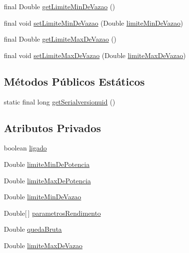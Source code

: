 \begin{DoxyCompactItemize}
\item 
final Double \hyperlink{classusina_1_1_d_a_o_1_1turbina_1_1_turbina_transfer_a4b6e40f8a29ecc5a568950cf150644ee}{get\-Limite\-Min\-De\-Vazao} ()
\item 
final void \hyperlink{classusina_1_1_d_a_o_1_1turbina_1_1_turbina_transfer_aab387846f77bd4763b074148dc03d19c}{set\-Limite\-Min\-De\-Vazao} (Double \hyperlink{classusina_1_1_d_a_o_1_1turbina_1_1_turbina_transfer_aa90e1fc61b14789cf04163ae4b76b810}{limite\-Min\-De\-Vazao})
\item 
final Double \hyperlink{classusina_1_1_d_a_o_1_1turbina_1_1_turbina_transfer_a8fe718b17c9f695aa6a48b7d7a153fb8}{get\-Limite\-Max\-De\-Vazao} ()
\item 
final void \hyperlink{classusina_1_1_d_a_o_1_1turbina_1_1_turbina_transfer_a8f62414f1ea058927f7dd90497ea275e}{set\-Limite\-Max\-De\-Vazao} (Double \hyperlink{classusina_1_1_d_a_o_1_1turbina_1_1_turbina_transfer_a07a09b7c71eb2f197aaf343851fe8f7b}{limite\-Max\-De\-Vazao})
\end{DoxyCompactItemize}
\subsection*{Métodos Públicos Estáticos}
\begin{DoxyCompactItemize}
\item 
static final long \hyperlink{classusina_1_1_d_a_o_1_1turbina_1_1_turbina_transfer_a69998933bc99e29515935abd270cba92}{get\-Serialversionuid} ()
\end{DoxyCompactItemize}
\subsection*{Atributos Privados}
\begin{DoxyCompactItemize}
\item 
boolean \hyperlink{classusina_1_1_d_a_o_1_1turbina_1_1_turbina_transfer_ae108175db307ad716b1508b2be10dba3}{ligado}
\item 
Double \hyperlink{classusina_1_1_d_a_o_1_1turbina_1_1_turbina_transfer_a9b91ed0c68d559ef9c7e2ea953bf052a}{limite\-Min\-De\-Potencia}
\item 
Double \hyperlink{classusina_1_1_d_a_o_1_1turbina_1_1_turbina_transfer_aaec5e55fb790620bbf92f759a3165a97}{limite\-Max\-De\-Potencia}
\item 
Double \hyperlink{classusina_1_1_d_a_o_1_1turbina_1_1_turbina_transfer_aa90e1fc61b14789cf04163ae4b76b810}{limite\-Min\-De\-Vazao}
\item 
Double\mbox{[}$\,$\mbox{]} \hyperlink{classusina_1_1_d_a_o_1_1turbina_1_1_turbina_transfer_a8395d06deeaaf0d3d525a48cb1e27d80}{parametros\-Rendimento}
\item 
Double \hyperlink{classusina_1_1_d_a_o_1_1turbina_1_1_turbina_transfer_a5b40ddc2d5b209be42cd79baf5a0d83f}{queda\-Bruta}
\item 
Double \hyperlink{classusina_1_1_d_a_o_1_1turbina_1_1_turbina_transfer_a07a09b7c71eb2f197aaf343851fe8f7b}{limite\-Max\-De\-Vazao}
\end{DoxyCompactItemize}
